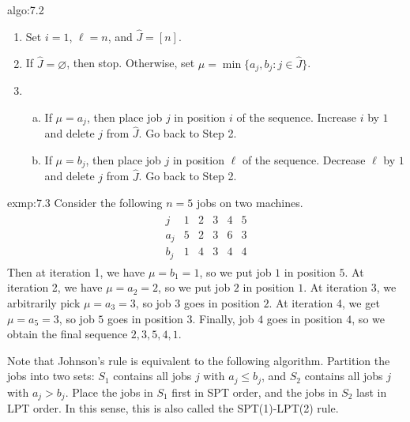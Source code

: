\begin{algo}{algo:7.2}
    \begin{enumerate}[(1)]
        \item Set $i = 1$, $\ell = n$, and $\hat J = [n]$. 
        \item If $\hat J = \varnothing$, then stop. Otherwise, set 
        $\mu = \min\{a_j, b_j : j \in \hat J\}$. 
        \item \begin{enumerate}[(a)]
            \item If $\mu = a_j$, then place job $j$ in position $i$
            of the sequence. Increase $i$ by $1$ and delete $j$ from 
            $\hat J$. Go back to Step 2. 
            \item If $\mu = b_j$, then place job $j$ in position $\ell$
            of the sequence. Decrease $\ell$ by $1$ and delete $j$ from 
            $\hat J$. Go back to Step 2. 
        \end{enumerate} 
    \end{enumerate}
\end{algo}

\begin{exmp}{exmp:7.3}
    Consider the following $n = 5$ jobs on two machines. 
    \begin{align*}
        \begin{array}{c|ccccc}
            j & 1 & 2 & 3 & 4 & 5 \\ \hline 
            a_j & 5 & 2 & 3 & 6 & 3 \\ 
            b_j & 1 & 4 & 3 & 4 & 4
        \end{array}
    \end{align*}
    Then at iteration 1, we have $\mu = b_1 = 1$, so we put job $1$ 
    in position $5$. At iteration 2, we have $\mu = a_2 = 2$, so we put 
    job $2$ in position $1$. At iteration 3, we arbitrarily pick 
    $\mu = a_3 = 3$, so job $3$ goes in position $2$. At iteration 4, 
    we get $\mu = a_5 = 3$, so job $5$ goes in position $3$. Finally, job 
    $4$ goes in position $4$, so we obtain the final sequence 
    $2, 3, 5, 4, 1$. 
\end{exmp}

Note that Johnson's rule is equivalent to the following algorithm. 
Partition the jobs into two sets: $S_1$ contains all jobs $j$ with 
$a_j \leq b_j$, and $S_2$ contains all jobs $j$ with $a_j > b_j$. 
Place the jobs in $S_1$ first in SPT order, and the jobs in $S_2$ last 
in LPT order. In this sense, this is also called the SPT(1)-LPT(2) rule. 


